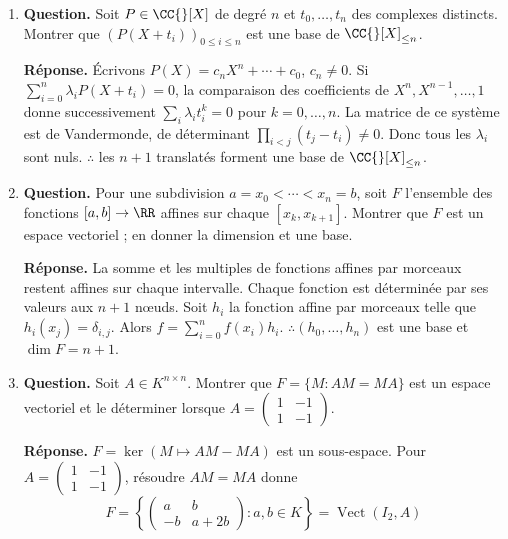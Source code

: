\documentclass[12pt, a4paper]{article}
\begin{document}
\begin{enumerate}[label=6.\arabic*., start=105]
\begin{minipage}[t]{\linewidth}
    Sans hypothèse de dimension finie, la condition correcte est
    $\dim(A/C)=\dim(B/C)$ ; la même construction avec des bases s'applique.
\end{minipage}

  \item \begin{minipage}[t]{\linewidth}\raggedright
\textbf{Question.} Soit $P\in\CC{}[X]$ de degré $n$ et $t_0,\ldots,t_n$ des complexes distincts. Montrer que $(P(X+t_i))_{0\leq i\leq n}$ est une base de $\CC{}[X]_{\leq n}$.
\par\smallskip
\textbf{Réponse.} Écrivons $P(X)=c_nX^n+\cdots+c_0$, $c_n\neq0$.
    Si $\sum_{i=0}^n\lambda_iP(X+t_i)=0$, la comparaison des coefficients de $X^n,X^{n-1},\ldots,1$ donne successivement
    $\sum_i\lambda_it_i^k=0$ pour $k=0,\ldots,n$.
    La matrice de ce système est de Vandermonde, de déterminant $\prod_{i<j}(t_j-t_i)\neq0$.
    Donc tous les $\lambda_i$ sont nuls.
    $\therefore$ les $n+1$ translatés forment une base de $\CC{}[X]_{\leq n}$.
\end{minipage}

  \item \begin{minipage}[t]{\linewidth}\raggedright
\textbf{Question.} Pour une subdivision $a=x_0<\cdots<x_n=b$, soit $F$ l’ensemble des fonctions $[a,b]\to\RR$ affines sur chaque $[x_k,x_{k+1}]$. Montrer que $F$ est un espace vectoriel ; en donner la dimension et une base.
\par\smallskip
\textbf{Réponse.} La somme et les multiples de fonctions affines par morceaux restent affines sur chaque intervalle.
    Chaque fonction est déterminée par ses valeurs aux $n+1$ nœuds.
    Soit $h_i$ la fonction affine par morceaux telle que $h_i(x_j)=\delta_{i,j}$.
    Alors $f=\sum_{i=0}^nf(x_i)h_i$.
    $\therefore(h_0,\ldots,h_n)$ est une base et $\dim F=n+1$.
\end{minipage}

  \item \begin{minipage}[t]{\linewidth}\raggedright
\textbf{Question.} Soit $A\in K^{n\times n}$. Montrer que $F=\{M:AM=MA\}$ est un espace vectoriel et le déterminer lorsque $A=\begin{pmatrix}1&-1\\1&-1\end{pmatrix}$.
\par\smallskip
\textbf{Réponse.} $F=\ker(M\mapsto AM-MA)$ est un sous-espace.
    Pour $A=\begin{pmatrix}1&-1\\1&-1\end{pmatrix}$, résoudre $AM=MA$ donne
    \[
      F=\left\{\begin{pmatrix}a&b\\-b&a+2b\end{pmatrix}:a,b\in K\right\}
      =\operatorname{Vect}(I_2,A)
    \]
\end{minipage}


\end{enumerate}
\end{document}
